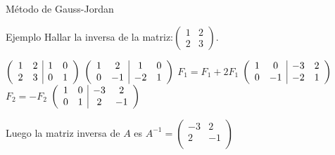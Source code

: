\documentclass[9pt,aspectratio=159]{beamer}
\newenvironment{gaussjordandos}{\left( \begin{array}{cc|cc}}{\end{array}\right)}
\begin{document}
\begin{frame}{Método de Gauss-Jordan}

\begin{exampleblock}{Ejemplo}
 Hallar la inversa de  la matriz:$\begin{pmatrix}
1 & 2  \\
2 & 3   \end{pmatrix}$.
\end{exampleblock}

\pause
$
\begin{gaussjordandos}
1 & 2  & 1& 0 \\
  2& 3  & 0& 1 \\
\end{gaussjordandos}
$
\pause
{}
\pause
$
\begin{gaussjordandos}
 1& 2  & 1& 0 \\
 0& -1  & -2& 1 \\
\end{gaussjordandos}
$
\pause
\alert{$F_1=F_1+2F_1$}
\pause
$\begin{gaussjordandos}
 1& 0  & -3& 2 \\
 0& -1  & -2& 1 \\
\end{gaussjordandos}$
\pause
\alert{${F_2=-F_2}$}
\pause
$
\begin{gaussjordandos}
 1& 0 &  -3& 2 \\
 0& 1  & 2& -1 \\
\end{gaussjordandos}
$

Luego la matriz inversa de $A$ es $A^{-1}=\begin{pmatrix}
  -3& 2 \\
  2& -1 \\
\end{pmatrix}$

\end{frame}
\end{document}
